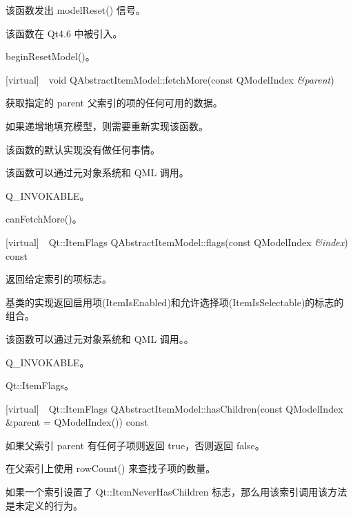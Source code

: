 该函数发出 modelReset() 信号。

该函数在 Qt4.6 中被引入。

\begin{seeAlso}
beginResetModel()。
\end{seeAlso}

[virtual] void QAbstractItemModel::fetchMore(const QModelIndex \emph{\&parent})

获取指定的 parent 父索引的项的任何可用的数据。

如果递增地填充模型，则需要重新实现该函数。

该函数的默认实现没有做任何事情。

\begin{notice}
该函数可以通过元对象系统和 QML 调用。
\end{notice}

\begin{seeAlso}
Q\_INVOKABLE。
\end{seeAlso}

\begin{seeAlso}
canFetchMore()。
\end{seeAlso}
  
[virtual] Qt::ItemFlags QAbstractItemModel::flags(const QModelIndex \emph{\&index}) const

返回给定索引的项标志。

基类的实现返回启用项(ItemIsEnabled)和允许选择项(ItemIsSelectable)的标志的组合。

\begin{notice}
该函数可以通过元对象系统和 QML 调用。。
\end{notice}

\begin{seeAlso}
Q\_INVOKABLE。
\end{seeAlso}

\begin{seeAlso}
Qt::ItemFlags。
\end{seeAlso}

[virtual] Qt::ItemFlags QAbstractItemModel::hasChildren(const QModelIndex \&parent = QModelIndex()) const

如果父索引 parent 有任何子项则返回 true，否则返回 false。

在父索引上使用 rowCount() 来查找子项的数量。

\begin{notice}
如果一个索引设置了 Qt::ItemNeverHasChildren 标志，那么用该索引调用该方法是未定义的行为。
\end{notice}

